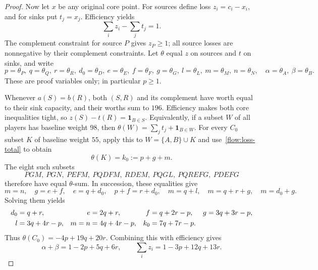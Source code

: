 \begin{proof}
Now let $x$ be any original core point. For sources define loss
$z_i=c_i-x_i$, and for sinks put $t_j=x_j$. Efficiency yields
\begin{equation}\label{flow:loss-total}
                       \sum_i z_i-\sum_j t_j=1.
\end{equation}
The complement constraint for source $P$ gives $z_P\ge1$;
all source losses are nonnegative by their complement constraints.
Let $\theta$ equal $z$ on sources and $t$ on sinks, and write
\[
 p=\theta_P,\ q=\theta_Q,\ r=\theta_R,\ d_0=\theta_D,
 \ e=\theta_E,\ f=\theta_F,\ g=\theta_G,\ l=\theta_L,
 \ m=\theta_M,\ n=\theta_N,\quad
 \alpha=\theta_A,\ \beta=\theta_B.
\]
These are proof variables only; in particular $p\ge1$.

Whenever $a(S)=b(R)$, both $(S,R)$ and its complement have worth
equal to their sink capacity, and their worths sum to $196$.
Efficiency makes both core inequalities tight, so
$z(S)-t(R)=\mathbf1_{B\in S}$. Equivalently, if a subset $W$ of all
players has baseline weight $98$, then
$\theta(W)=\sum_jt_j+\mathbf1_{B\in W}$.
For every $C_0$ subset $K$ of baseline weight $55$, apply this to
$W=\{A,B\}\cup K$ and use~\eqref{flow:loss-total} to obtain
\[
                     \theta(K)=k_0:=p+g+m.
\]
The eight such subsets
\[
 PGM,\ PGN,\ PEFM,\ PQDFM,\ RDEM,\ PQGL,\ PQREFG,\ PDEFG
\]
therefore have equal $\theta$-sum. In succession, these equalities give
\[
 m=n,\quad g=e+f,\quad e=q+d_0,\quad p+f=r+d_0,
 \quad m=q+l,\quad m=q+r+g,\quad m=d_0+g.
\]
Solving them yields
\begin{align}
 d_0&=q+r,&e&=2q+r,&f&=q+2r-p,&g&=3q+3r-p,\notag\\
 l&=3q+4r-p,&m=n&=4q+4r-p,&k_0&=7q+7r-p.
       \label{flow:identities}
\end{align}
Thus $\theta(C_0)=-4p+19q+20r$. Combining this with efficiency gives
\begin{equation}\label{flow:loss-formulas}
 \alpha+\beta=1-2p+5q+6r,\qquad
                 \sum_i z_i=1-3p+12q+13r.
\end{equation}


\end{proof}
